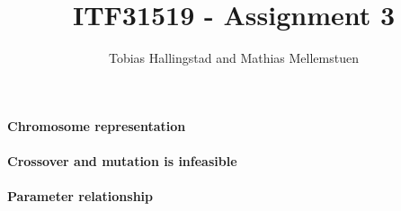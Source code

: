 \documentclass[10pt]{article}
\title{ITF31519 - Assignment 3}
\author{Tobias Hallingstad and Mathias Mellemstuen}
\begin{document}
    \begin{titlepage}
        \maketitle
    \end{titlepage}


    \paragraph{Chromosome representation}

    \paragraph{Crossover and mutation is infeasible}

    \paragraph{Parameter relationship}
\end{document}
